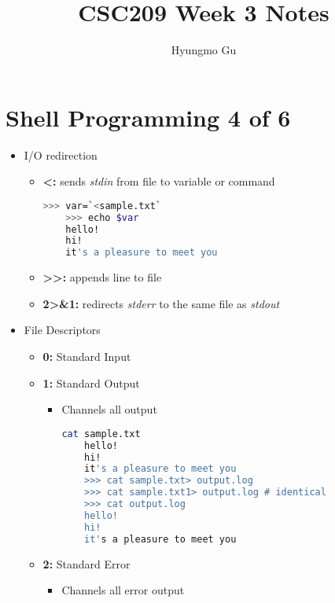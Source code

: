 \documentclass[12pt]{article}
\begin{document}
\title{CSC209 Week 3 Notes}
\author{Hyungmo Gu}
\maketitle

\section*{Shell Programming 4 of 6}

\bigskip

\begin{itemize}
    \item I/O redirection
    \begin{itemize}
    \item \textbf{\textless:} sends \textit{stdin} from file to variable or command
    \begin{lstlisting}[language=bash]
    >>> var=`<sample.txt`
    >>> echo $var
    hello!
    hi!
    it's a pleasure to meet you
    \end{lstlisting}

    \item \textbf{\textgreater\textgreater:} appends line to file\
    \item \textbf{2\textgreater\&1:} redirects \textit{stderr} to the same file as \textit{stdout}

    \end{itemize}
    \item File Descriptors
    \begin{itemize}
    \item \textbf{0:} Standard Input
    \item \textbf{1:} Standard Output
    \begin{itemize}
    \item Channels all output

    \begin{lstlisting}[language=bash]
    cat sample.txt
    hello!
    hi!
    it's a pleasure to meet you
    >>> cat sample.txt> output.log
    >>> cat sample.txt1> output.log # identical
    >>> cat output.log
    hello!
    hi!
    it's a pleasure to meet you
    \end{lstlisting}
    \end{itemize}

    \item \textbf{2:} Standard Error
    \begin{itemize}
    \item Channels all error output


\end{itemize}
\end{itemize}
\end{itemize}
\end{document}
